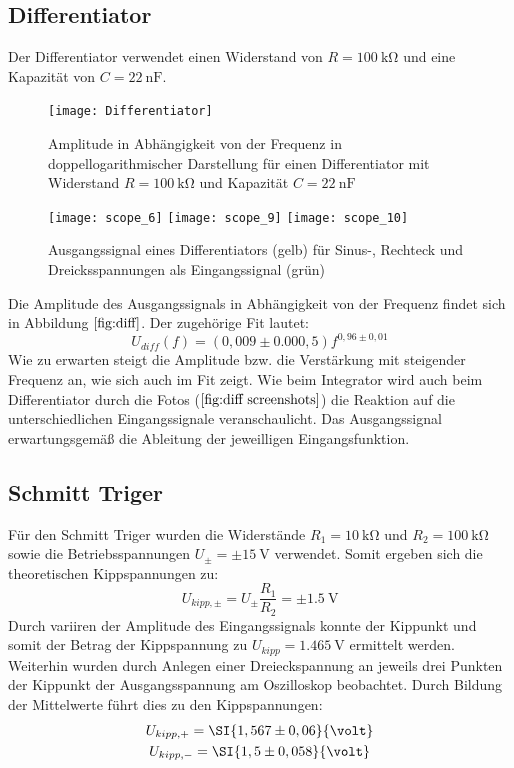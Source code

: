 \subsection{Differentiator}
Der Differentiator verwendet einen Widerstand von $R=\SI{100}{\kilo\ohm}$ und eine Kapazität von $C=\SI{22}{\nano\farad}$.
\begin{figure}
\centering
\texttt{[image: Differentiator]}
\label{fig:diff}
\caption{Amplitude in Abhängigkeit von der Frequenz in doppellogarithmischer Darstellung für einen Differentiator mit Widerstand $R=\SI{100}{\kilo\ohm}$ und Kapazität $C=\SI{22}{\nano\farad}$}
\end{figure}
\begin{figure}
\centering
\texttt{[image: scope\_6]}
\texttt{[image: scope\_9]}
\texttt{[image: scope\_10]}
\label{fig:diff screenshots}
\caption{Ausgangssignal eines Differentiators (gelb) für Sinus-, Rechteck und Dreicksspannungen als Eingangssignal (grün)}
\end{figure}
Die Amplitude des Ausgangssignals in Abhängigkeit von der Frequenz findet sich in Abbildung $\ref{fig:diff}$. Der zugehörige Fit lautet:
\begin{equation}
U_{diff}(f)=(0,009\pm0.000,5)f^{0,96\pm0,01}
\end{equation}
Wie zu erwarten steigt die Amplitude bzw. die Verstärkung mit steigender Frequenz an, wie sich auch im Fit zeigt.
Wie beim Integrator wird auch beim Differentiator durch die Fotos ($\ref{fig:diff screenshots}$) die Reaktion auf die unterschiedlichen Eingangssignale veranschaulicht. Das Ausgangssignal erwartungsgemäß die Ableitung der jeweilligen Eingangsfunktion.
\subsection{Schmitt Triger}
Für den Schmitt Triger wurden die Widerstände $R_1=\SI{10}{\kilo\ohm}$ und $R_2=\SI{100}{\kilo\ohm}$ sowie die Betriebsspannungen $U_{\pm}=\pm\SI{15}{\volt}$ verwendet.
Somit ergeben sich die theoretischen Kippspannungen zu:
\begin{equation}
U_{kipp,\pm}=U_{\pm}\frac{R_1}{R_2}=\pm\SI{1,5}{\volt}
\end{equation}
Durch variiren der Amplitude des Eingangssignals konnte der Kippunkt und somit der Betrag der Kippspannung zu $U_{kipp}=\SI{1,465}{\volt}$ ermittelt werden. Weiterhin wurden durch Anlegen einer Dreieckspannung an jeweils drei Punkten der Kippunkt der Ausgangsspannung am Oszilloskop beobachtet. Durch Bildung der Mittelwerte führt dies zu den Kippspannungen:
\begin{gather}
U_{kipp,+}=\SI{1,567\pm0,06}{\volt} \\
U_{kipp,-}=\SI{1,5\pm0,058}{\volt}
\end{gather}
